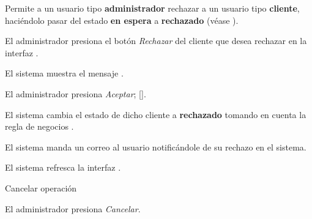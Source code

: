 %
%

{
  Permite a un usuario tipo \textbf{administrador} rechazar a un usuario tipo
  \textbf{cliente}, haciéndolo pasar del estado \textbf{en espera} a
  \textbf{rechazado} (véase ).

  \begin{trayectoriaPrincipal}

    \item El administrador presiona el botón \textit{Rechazar} del cliente que
      desea rechazar en la interfaz .

    \item El sistema muestra el mensaje .

    \item El administrador presiona \textit{Aceptar};
      [].

    \item El sistema cambia el estado de dicho cliente a \textbf{rechazado}
      tomando en cuenta la regla de negocios .

    \item El sistema manda un correo al usuario notificándole de su
      rechazo en el sistema.

    \item El sistema refresca la interfaz .

  \end{trayectoriaPrincipal}


  \begin{trayectoriaAlternativa}[ta:cancelar]
    {Cancelar operación}

    \item El administrador presiona \textit{Cancelar}.

  \end{trayectoriaAlternativa}
}
